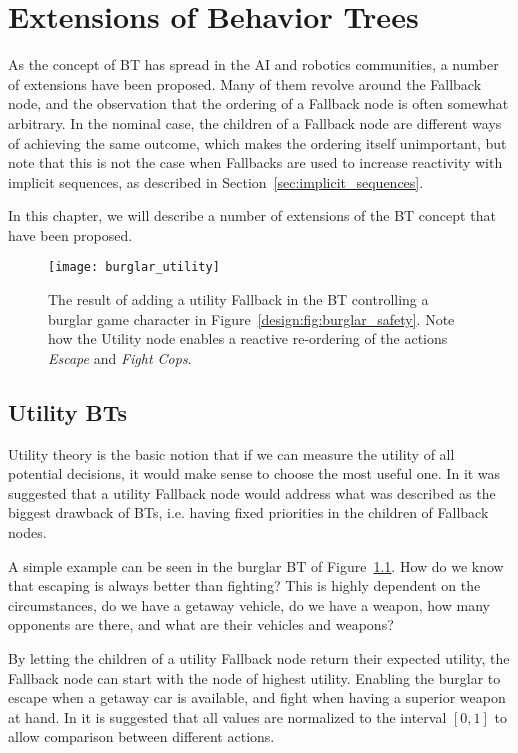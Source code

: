 
\chapter{Extensions of Behavior Trees}
\label{ch:extensions}
\graphicspath{{extensions/}}

As the concept of BT has spread in the AI and robotics communities, a number of extensions have been proposed.
Many of them revolve around the Fallback node, and the observation that the ordering of a Fallback node is often somewhat arbitrary.
In the nominal case, the children of a Fallback node are different ways of achieving the same outcome,
which makes the ordering itself unimportant, but note that this is not the case when Fallbacks are used to increase reactivity with implicit sequences, as described in Section~\ref{sec:implicit_sequences}. 

In this chapter, we will describe a number of extensions of the BT concept that have been proposed.


\begin{figure}[h]
\centering
  \texttt{[image: burglar\_utility]}
\caption{The result of adding a utility Fallback in the BT controlling a burglar game character in Figure~\ref{design:fig:burglar_safety}.
Note how the Utility node enables a reactive re-ordering of the actions \emph{Escape} and \emph{Fight Cops}.}
\label{design:fig:burglar_utility}
\end{figure}

\section{Utility BTs}
Utility theory is the basic notion that if we can measure the utility of all potential decisions, it would make sense to 
choose the most useful one. In \cite{merrill2014building} it was suggested that a utility Fallback node would address what was described as the biggest drawback of BTs, i.e. having fixed priorities in the children of Fallback nodes.

A simple example can be seen in the burglar BT of Figure~\ref{design:fig:burglar_utility}.
How do we know that escaping is always better than fighting?
This is highly dependent on the circumstances, do we have a getaway vehicle, do we have a weapon, how many opponents are there, and what are their vehicles and weapons?

By letting the children of a utility Fallback node return their expected utility, the Fallback node can start with the node of highest utility. Enabling the burglar to escape when a getaway car is available, and fight when having a superior weapon at hand. 
In \cite{merrill2014building} it is suggested that all values are normalized to the interval $[0,1]$ to allow comparison between different actions.

